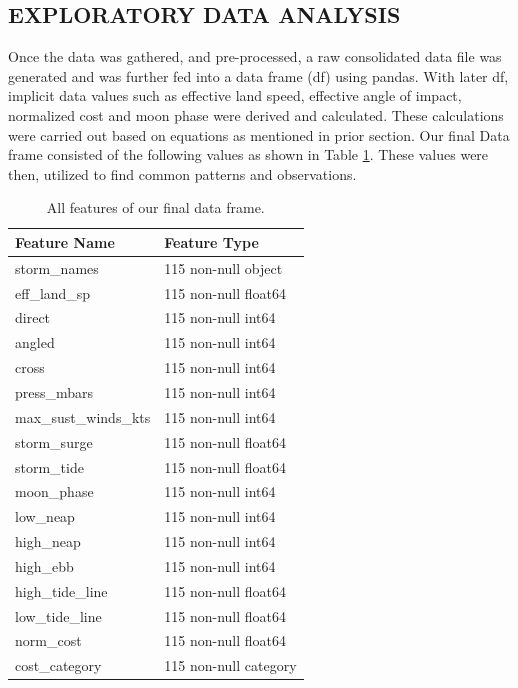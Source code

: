\documentclass[letterpaper, 10 pt, conference]{ieeeconf}  %
\begin{document}
\subsection{EXPLORATORY DATA ANALYSIS}
Once the data was gathered, and pre-processed, a raw consolidated data file was generated and was further fed into a data frame (df) using pandas. With later df, implicit data values such as effective land speed, effective angle of impact, normalized cost and moon phase were derived and calculated. These calculations were carried out based on equations as mentioned in prior section. Our final Data frame consisted of the following values as shown in Table \ref{table:allfeat}. These values were then, utilized to find common patterns and observations.

\begin{table}[ht]
\caption{All features of our final data frame.}
\centering
\begin{tabular}{|l|l|}
\hline
\textbf{Feature Name} & \textbf{Feature Type} \\ \hline
storm\_names & 115 non-null object \\ \hline
eff\_land\_sp & 115 non-null float64 \\ \hline
direct & 115 non-null int64 \\ \hline
angled & 115 non-null int64 \\ \hline
cross & 115 non-null int64 \\ \hline
press\_mbars & 115 non-null int64 \\ \hline
max\_sust\_winds\_kts & 115 non-null int64 \\ \hline
storm\_surge & 115 non-null float64 \\ \hline
storm\_tide & 115 non-null float64 \\ \hline
moon\_phase & 115 non-null int64 \\ \hline
low\_neap & 115 non-null int64 \\ \hline
high\_neap & 115 non-null int64 \\ \hline
high\_ebb & 115 non-null int64 \\ \hline
high\_tide\_line & 115 non-null float64 \\ \hline
low\_tide\_line & 115 non-null float64 \\ \hline
norm\_cost & 115 non-null float64 \\ \hline
cost\_category & 115 non-null category \\ \hline
\end{tabular}
\label{table:allfeat}
\end{table}
\end{document}
